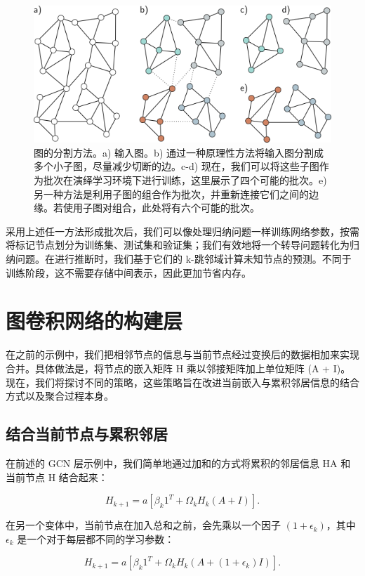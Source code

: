\begin{figure}[ht!]
\centering
\includegraphics[width=0.7\linewidth]{png/chapter13/GraphPartitioning.png}
\caption{图的分割方法。a) 输入图。b) 通过一种原理性方法将输入图分割成多个小子图，尽量减少切断的边。c-d) 现在，我们可以将这些子图作为批次在演绎学习环境下进行训练，这里展示了四个可能的批次。e) 另一种方法是利用子图的组合作为批次，并重新连接它们之间的边缘。若使用子图对组合，此处将有六个可能的批次。}
\end{figure}


采用上述任一方法形成批次后，我们可以像处理归纳问题一样训练网络参数，按需将标记节点划分为训练集、测试集和验证集；我们有效地将一个转导问题转化为归纳问题。在进行推断时，我们基于它们的 k-跳邻域计算未知节点的预测。不同于训练阶段，这不需要存储中间表示，因此更加节省内存。
\section{图卷积网络的构建层}
在之前的示例中，我们把相邻节点的信息与当前节点经过变换后的数据相加来实现合并。具体做法是，将节点的嵌入矩阵 H 乘以邻接矩阵加上单位矩阵 (A + I)。现在，我们将探讨不同的策略，这些策略旨在改进当前嵌入与累积邻居信息的结合方式以及聚合过程本身。

\subsection{结合当前节点与累积邻居}

在前述的 GCN 层示例中，我们简单地通过加和的方式将累积的邻居信息 HA 和当前节点 H 结合起来：

\begin{equation}
H_{k+1} = a \left[ \beta_k 1^T + \Omega_k H_k (A + I) \right]. 
\end{equation}

在另一个变体中，当前节点在加入总和之前，会先乘以一个因子 \((1 + \epsilon_k)\)，其中 \(\epsilon_k\) 是一个对于每层都不同的学习参数：

\begin{equation}
H_{k+1} = a \left[ \beta_{k} 1^T + \Omega_k H_k (A + (1 + \epsilon_k)I) \right]. 
\end{equation}

